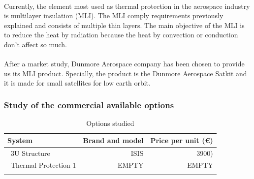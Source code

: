\paragraph{} 
Currently, the element most used as thermal protection in the aerospace industry is multilayer insulation (MLI). The MLI comply requirements previously explained and consists of multiple thin layers. The main objective of the MLI is to reduce the heat by radiation because the heat by convection or conduction don't affect so much.

\paragraph{} 
After a market study, Dunmore Aerospace company has been chosen to provide us its MLI product. Specially, the product is the Dunmore Aerospace Satkit and it is made for small satellites for low earth orbit.

\subsubsection{Study of the commercial available options}

\begin{longtable}{| l | r | r | }
\hline
\rowcolor[gray]{0.80}	\textbf{System} &  \textbf{Brand and model}     & \textbf{Price per unit (\euro)}   \\
\hline
\endfirsthead

	   ~3U Structure & ISIS & 3900) \\
	   ~Thermal Protection 1 & EMPTY & EMPTY \\
	\hline

\caption{Options studied}
\label{epsoptionstable}
\end{longtable}
